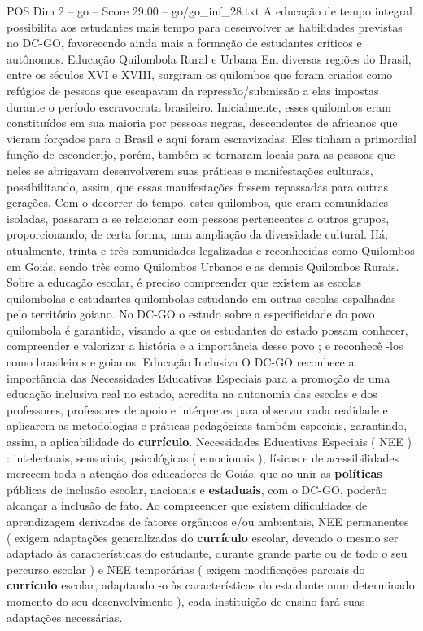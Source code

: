 \begin{textsample}{POS Dim 2 – go – Score 29.00 – go/go\_inf\_28.txt}
A educação de tempo integral possibilita aos estudantes mais tempo para desenvolver as habilidades previstas no DC-GO, favorecendo ainda mais a formação de estudantes críticos e autônomos.
Educação Quilombola Rural e Urbana Em diversas regiões do Brasil, entre os séculos XVI e XVIII, surgiram os quilombos que foram criados como refúgios de pessoas que escapavam da repressão/submissão a elas impostas durante o período escravocrata brasileiro.
Inicialmente, esses quilombos eram constituídos em sua maioria por pessoas negras, descendentes de africanos que vieram forçados para o Brasil e aqui foram escravizadas.
Eles tinham a primordial função de esconderijo, porém, também se tornaram locais para as pessoas que neles se abrigavam desenvolverem suas práticas e manifestações culturais, possibilitando, assim, que essas manifestações fossem repassadas para outras gerações.
Com o decorrer do tempo, estes quilombos, que eram comunidades isoladas, passaram a se relacionar com pessoas pertencentes a outros grupos, proporcionando, de certa forma, uma ampliação da diversidade cultural.
Há, atualmente, trinta e três comunidades legalizadas e reconhecidas como Quilombos em Goiás, sendo três como Quilombos Urbanos e as demais Quilombos Rurais.
Sobre a educação escolar, é preciso compreender que existem as escolas quilombolas e estudantes quilombolas estudando em outras escolas espalhadas pelo território goiano.
No DC-GO o estudo sobre a especificidade do povo quilombola é garantido, visando a que os estudantes do estado possam conhecer, compreender e valorizar a história e a importância desse povo ; e reconhecê -los como brasileiros e goianos.
Educação Inclusiva O DC-GO reconhece a importância das Necessidades Educativas Especiais para a promoção de uma educação inclusiva real no estado, acredita na autonomia das escolas e dos professores, professores de apoio e intérpretes para observar cada realidade e aplicarem as metodologias e práticas pedagógicas também especiais, garantindo, assim, a aplicabilidade do \textbf{currículo}.
Necessidades Educativas Especiais ( NEE ) : intelectuais, sensoriais, psicológicas ( emocionais ), físicas e de acessibilidades merecem toda a atenção dos educadores de Goiás, que ao unir as \textbf{políticas} públicas de inclusão escolar, nacionais e \textbf{estaduais}, com o DC-GO, poderão alcançar a inclusão de fato.
Ao compreender que existem dificuldades de aprendizagem derivadas de fatores orgânicos e/ou ambientais, NEE permanentes ( exigem adaptações generalizadas do \textbf{currículo} escolar, devendo o mesmo ser adaptado às características do estudante, durante grande parte ou de todo o seu percurso escolar ) e NEE temporárias ( exigem modificações parciais do \textbf{currículo} escolar, adaptando -o às características do estudante num determinado momento do seu desenvolvimento ), cada instituição de ensino fará suas adaptações necessárias.

\end{textsample}
